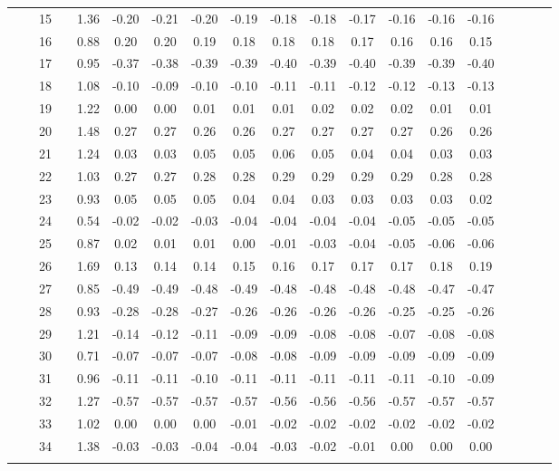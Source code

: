 \documentclass[a4paper,11pt,oneside,openany]{jsbook}
\newcommand{\bhline}[1]{\noalign{\hrule height #1}}
\begin{document}
\begin{table}[h!]
\begin{center}
\begin{tabular}{ccccccccccccccccccc}
 &  & 15 &  & 1.36 & -0.20 & -0.21 & -0.20 & -0.19 & -0.18 & -0.18 & -0.17 & -0.16 & -0.16 & -0.16 \\
 &  & 16 &  & 0.88 & 0.20  & 0.20  & 0.19  & 0.18  & 0.18  & 0.18  & 0.17  & 0.16  & 0.16  & 0.15  \\
 &  & 17 &  & 0.95 & -0.37 & -0.38 & -0.39 & -0.39 & -0.40 & -0.39 & -0.40 & -0.39 & -0.39 & -0.40 \\
 &  & 18 &  & 1.08 & -0.10 & -0.09 & -0.10 & -0.10 & -0.11 & -0.11 & -0.12 & -0.12 & -0.13 & -0.13 \\
 &  & 19 &  & 1.22 & 0.00  & 0.00  & 0.01  & 0.01  & 0.01  & 0.02  & 0.02  & 0.02  & 0.01  & 0.01  \\
 &  & 20 &  & 1.48 & 0.27  & 0.27  & 0.26  & 0.26  & 0.27  & 0.27  & 0.27  & 0.27  & 0.26  & 0.26  \\
 &  & 21 &  & 1.24 & 0.03  & 0.03  & 0.05  & 0.05  & 0.06  & 0.05  & 0.04  & 0.04  & 0.03  & 0.03  \\
 &  & 22 &  & 1.03 & 0.27  & 0.27  & 0.28  & 0.28  & 0.29  & 0.29  & 0.29  & 0.29  & 0.28  & 0.28  \\
 &  & 23 &  & 0.93 & 0.05  & 0.05  & 0.05  & 0.04  & 0.04  & 0.03  & 0.03  & 0.03  & 0.03  & 0.02  \\
 &  & 24 &  & 0.54 & -0.02 & -0.02 & -0.03 & -0.04 & -0.04 & -0.04 & -0.04 & -0.05 & -0.05 & -0.05 \\
 &  & 25 &  & 0.87 & 0.02  & 0.01  & 0.01  & 0.00  & -0.01 & -0.03 & -0.04 & -0.05 & -0.06 & -0.06 \\
 &  & 26 &  & 1.69 & 0.13  & 0.14  & 0.14  & 0.15  & 0.16  & 0.17  & 0.17  & 0.17  & 0.18  & 0.19  \\
 &  & 27 &  & 0.85 & -0.49 & -0.49 & -0.48 & -0.49 & -0.48 & -0.48 & -0.48 & -0.48 & -0.47 & -0.47 \\
 &  & 28 &  & 0.93 & -0.28 & -0.28 & -0.27 & -0.26 & -0.26 & -0.26 & -0.26 & -0.25 & -0.25 & -0.26 \\
 &  & 29 &  & 1.21 & -0.14 & -0.12 & -0.11 & -0.09 & -0.09 & -0.08 & -0.08 & -0.07 & -0.08 & -0.08 \\
 &  & 30 &  & 0.71 & -0.07 & -0.07 & -0.07 & -0.08 & -0.08 & -0.09 & -0.09 & -0.09 & -0.09 & -0.09 \\
 &  & 31 &  & 0.96 & -0.11 & -0.11 & -0.10 & -0.11 & -0.11 & -0.11 & -0.11 & -0.11 & -0.10 & -0.09 \\
 &  & 32 &  & 1.27 & -0.57 & -0.57 & -0.57 & -0.57 & -0.56 & -0.56 & -0.56 & -0.57 & -0.57 & -0.57 \\
 &  & 33 &  & 1.02 & 0.00  & 0.00  & 0.00  & -0.01 & -0.02 & -0.02 & -0.02 & -0.02 & -0.02 & -0.02 \\
 &  & 34 &  & 1.38 & -0.03 & -0.03 & -0.04 & -0.04 & -0.03 & -0.02 & -0.01 & 0.00  & 0.00  & 0.00 \\
\bhline{1pt}
\end{tabular}
\label{t10param1}
\end{center}
\end{table}
\end{document}
